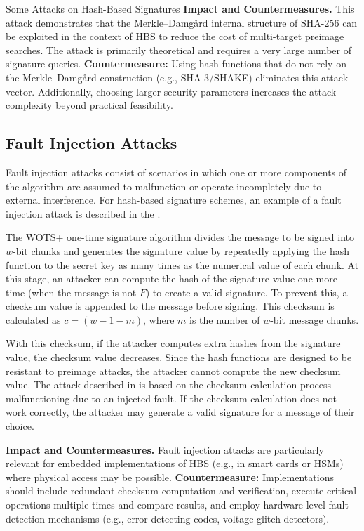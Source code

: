 \documentclass[version=preprint]{iacrcc}
\begin{document}
\begin{section}{Some Attacks on Hash-Based Signatures}
\textbf{Impact and Countermeasures.}
This attack demonstrates that the Merkle--Damg\r{a}rd internal structure of SHA-256 can be exploited in the context of HBS to reduce the cost of multi-target preimage searches. The attack is primarily theoretical and requires a very large number of signature queries. \textbf{Countermeasure:} Using hash functions that do not rely on the Merkle--Damg\r{a}rd construction (e.g., SHA-3/SHAKE) eliminates this attack vector. Additionally, choosing larger security parameters increases the attack complexity beyond practical feasibility.

\subsection{Fault Injection Attacks}

Fault injection attacks consist of scenarios in which one or more components of the algorithm are assumed to malfunction or operate incompletely due to external interference. For hash-based signature schemes, an example of a fault injection attack is described in the \cite{wagner2023faulting}.

The WOTS+ one-time signature algorithm divides the message to be signed into $w$-bit chunks and generates the signature value by repeatedly applying the hash function to the secret key as many times as the numerical value of each chunk. At this stage, an attacker can compute the hash of the signature value one more time (when the message is not $F$) to create a valid signature. To prevent this, a checksum value is appended to the message before signing. This checksum is calculated as $c = (w - 1 - m)$, where $m$ is the number of $w$-bit message chunks.

With this checksum, if the attacker computes extra hashes from the signature value, the checksum value decreases. Since the hash functions are designed to be resistant to preimage attacks, the attacker cannot compute the new checksum value. The attack described in \cite{wagner2023faulting} is based on the checksum calculation process malfunctioning due to an injected fault. If the checksum calculation does not work correctly, the attacker may generate a valid signature for a message of their choice.

\textbf{Impact and Countermeasures.}
Fault injection attacks are particularly relevant for embedded implementations of HBS (e.g., in smart cards or HSMs) where physical access may be possible. \textbf{Countermeasure:} Implementations should include redundant checksum computation and verification, execute critical operations multiple times and compare results, and employ hardware-level fault detection mechanisms (e.g., error-detecting codes, voltage glitch detectors).


\end{section}
\end{document}
